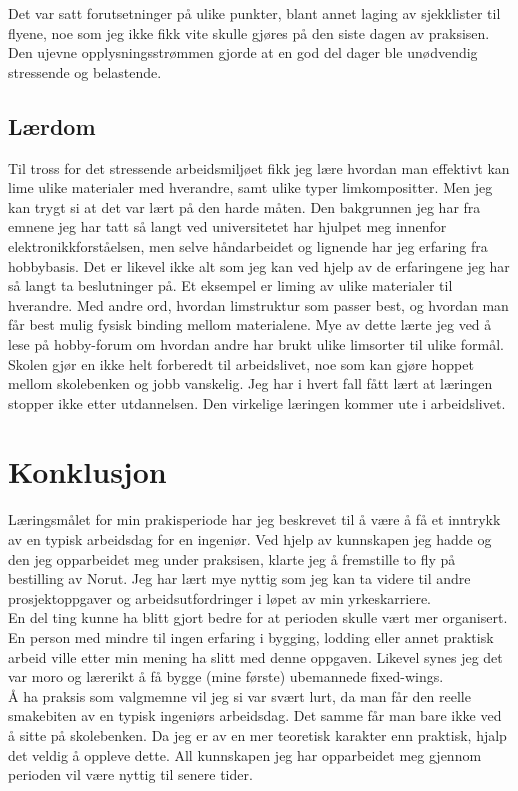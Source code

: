 \documentclass[12pt, a4paper]{article}
\begin{document}
Det var satt forutsetninger på ulike punkter, blant annet laging av sjekklister til flyene, noe som jeg ikke fikk vite skulle gjøres på den siste dagen av praksisen. Den ujevne opplysningsstrømmen gjorde at en god del dager ble unødvendig stressende og belastende. 

\subsection{Lærdom}
Til tross for det stressende arbeidsmiljøet fikk jeg lære hvordan man effektivt kan lime ulike materialer med hverandre, samt ulike typer limkompositter. Men jeg kan trygt si at det var lært på den harde måten. Den bakgrunnen jeg har fra emnene jeg har tatt så langt ved universitetet har hjulpet meg innenfor elektronikkforståelsen, men selve håndarbeidet og lignende har jeg erfaring fra hobbybasis. Det er likevel ikke alt som jeg kan ved hjelp av de erfaringene jeg har så langt ta beslutninger på. Et eksempel er liming av ulike materialer til hverandre. Med andre ord, hvordan limstruktur som passer best, og hvordan man får best mulig fysisk binding mellom materialene. Mye av dette lærte jeg ved å lese på hobby-forum om hvordan andre har brukt ulike limsorter til ulike formål. \\
Skolen gjør en ikke helt forberedt til arbeidslivet, noe som kan gjøre hoppet mellom skolebenken og jobb vanskelig. Jeg har i hvert fall fått lært at læringen stopper ikke etter utdannelsen. Den virkelige læringen kommer ute i arbeidslivet. 

\section{Konklusjon}
Læringsmålet for min prakisperiode har jeg beskrevet til å være å få et inntrykk av en typisk arbeidsdag for en ingeniør. Ved hjelp av kunnskapen jeg hadde og den jeg opparbeidet meg under praksisen, klarte jeg å fremstille to fly på bestilling av Norut. Jeg har lært mye nyttig som jeg kan ta videre til andre prosjektoppgaver og arbeidsutfordringer i løpet av min yrkeskarriere. \\
En del ting kunne ha blitt gjort bedre for at perioden skulle vært mer organisert. En person med mindre til ingen erfaring i bygging, lodding eller annet praktisk arbeid ville etter min mening ha slitt med denne oppgaven. Likevel synes jeg det var moro og lærerikt å få bygge (mine første) ubemannede fixed-wings. \\
Å ha praksis som valgmemne vil jeg si var svært lurt, da man får den reelle smakebiten av en typisk ingeniørs arbeidsdag. Det samme får man bare ikke ved å sitte på skolebenken. Da jeg er av en mer teoretisk karakter enn praktisk, hjalp det veldig å oppleve dette. All kunnskapen jeg har opparbeidet meg gjennom perioden vil være nyttig til senere tider. 
\clearpage
\end{document}
